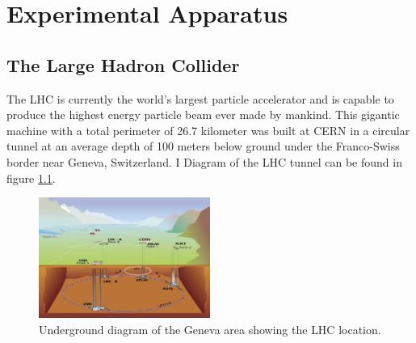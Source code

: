 \chapter{Experimental Apparatus}
\label{CHAPTER:ExperimentalApparatus}

\section{The Large Hadron Collider}
\label{SECTION:ExperimentalApparatus_LHC}

%

%  

The \gls{LHC}\cite{ARTICLE:LHC Machine} is currently the world's largest particle accelerator and is capable to produce the highest energy particle beam ever made by mankind. This gigantic machine with a total perimeter of 26.7 kilometer was built at \gls{CERN} in a circular tunnel at an average depth of 100 meters below ground under the Franco-Swiss border near Geneva, Switzerland. I Diagram of the LHC tunnel can be found in figure \ref{FIGURE:ExperimentalApparatus_LHCLayoutUnderground}.

\begin{figure}[!htb]
  \centering
  \includegraphics[width=0.50\textwidth]{Chapter02/LHC/Images/LHC_layout_underground.jpg}
  \caption{Underground diagram of the Geneva area showing the \gls{LHC} location.}
  \label{FIGURE:ExperimentalApparatus_LHCLayoutUnderground}
\end{figure}

